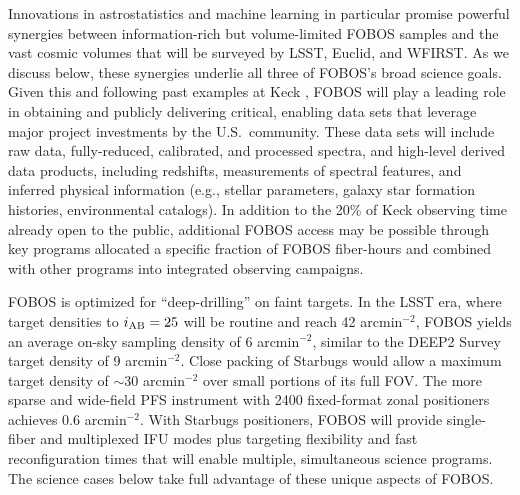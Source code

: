 Innovations in astrostatistics and machine learning in particular promise powerful synergies between information-rich
but volume-limited FOBOS samples and the vast cosmic volumes that will be surveyed by LSST, Euclid, and WFIRST.  As we
discuss below, these synergies underlie all three of FOBOS's broad science goals.  Given this and following past
examples at Keck \citep[e.g., DEEP2][]{newman13}, FOBOS will play a leading role in obtaining and publicly delivering
critical, enabling data sets that leverage major project investments by the U.S.~community.  These data sets will
include raw data, fully-reduced, calibrated, and processed spectra, and high-level derived data products, including
redshifts, measurements of spectral features, and inferred physical information (e.g., stellar parameters, galaxy star
formation histories, environmental catalogs).  In addition to the 20\% of Keck observing time already open to the
public, additional FOBOS access may be possible through key programs allocated a specific fraction of FOBOS fiber-hours
and combined with other programs into integrated observing campaigns.

FOBOS is optimized for ``deep-drilling'' on faint targets. In the
LSST era, where target densities to $i_{\rm AB} = 25$ will be routine
and reach 42 arcmin$^{-2}$, FOBOS yields an average on-sky sampling
density of 6 arcmin$^{-2}$, similar to the DEEP2 Survey target
density of 9 arcmin$^{-2}$. Close packing of Starbugs would allow a
maximum target density of $\sim$30 arcmin$^{-2}$ over small portions
of its full FOV. The more sparse and wide-field PFS instrument with
2400 fixed-format zonal positioners achieves 0.6 arcmin$^{-2}$. With
Starbugs positioners, FOBOS will provide single-fiber and multiplexed
IFU modes plus targeting flexibility and fast reconfiguration times
that will enable multiple, simultaneous science programs. The science
cases below take full advantage of these unique aspects of FOBOS.


